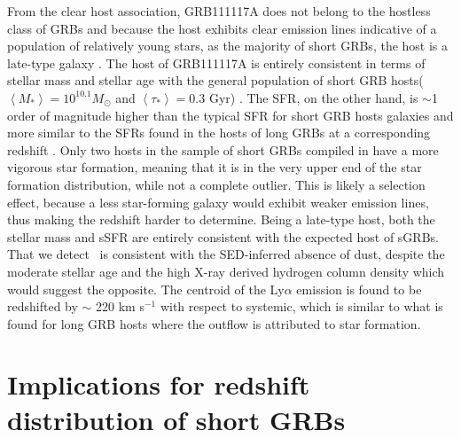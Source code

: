 \documentclass{aa}    %
\begin{document}
From the clear host association, GRB111117A does not belong to the hostless class of GRBs \citep{Berger2010a} and because the host exhibits clear emission lines indicative of a population of relatively young stars, as the majority of short GRBs, the host is a late-type galaxy \citep{Fong2013b}.
The host of GRB111117A is entirely consistent in terms of stellar mass and stellar age with the general population of short GRB hosts($\left\langle M _* \right\rangle = 10^{10.1} M_{\odot}$ and $\left\langle \tau _* \right\rangle = 0.3 $ Gyr) \citet{Leibler2010}. The SFR, on the other hand, is $\sim$1 order of magnitude higher than the typical SFR for short GRB hosts galaxies \citep{Berger2014} and more similar to the SFRs found in the hosts of long GRBs at a corresponding redshift \citep{Kruhler2015}. Only two hosts in the sample of short GRBs compiled in \citet{Berger2014} have a more vigorous star formation, meaning that it is in the very upper end of the star formation distribution, while not a complete outlier. This is likely a selection effect, because a less star-forming galaxy would exhibit weaker emission lines, thus making the redshift harder to determine. Being a late-type host, both the stellar mass and sSFR are entirely consistent with the expected host of sGRBs\citep{Behroozi2014}.
That we detect \lya~is consistent with the SED-inferred absence of dust, despite the moderate stellar age and the high X-ray derived hydrogen column density which would suggest the opposite. The centroid of the Ly$\alpha$ emission is found to be redshifted by $\sim$ 220 km s$^{-1}$ with respect to systemic, which is similar to what is found for long GRB hosts \citep{Milvang-Jensen2012a} where the outflow is attributed to star formation.




\section{Implications for redshift distribution of short GRBs}
\end{document}
